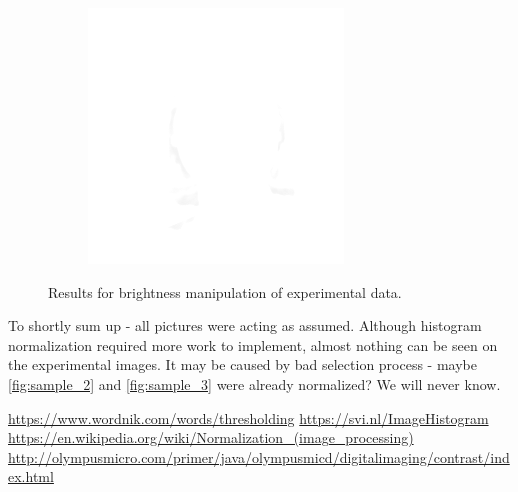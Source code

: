 \documentclass{article}
\begin{document}
\begin{figure}[h]
\begin{subfigure}{.3\textwidth}
    \caption{}
      \label{fig:brigth_low_4}
\end{subfigure}
\begin{subfigure}{.3\textwidth}
  \centering
  \includegraphics[width=0.97\linewidth]{_Figures/sample_4_brigthness_high.png}
    \caption{}
        \label{fig:brigth_high_4}
\end{subfigure}


\caption{Results for brightness manipulation of experimental data. }
\label{fig:brigthness_results}
\end{figure}

To shortly sum up - all pictures were acting as assumed. Although histogram normalization required more work to implement, almost nothing can be seen on the experimental images. It may be caused by bad selection process - maybe \ref{fig:sample_2} and \ref{fig:sample_3} were already normalized? We will never know.
\newpage

\begin{thebibliography}{1}
	 \url{https://www.wordnik.com/words/thresholding}
	 \url{https://svi.nl/ImageHistogram}
	 \url{https://en.wikipedia.org/wiki/Normalization_(image_processing)}
	 \url{http://olympusmicro.com/primer/java/olympusmicd/digitalimaging/contrast/index.html}
\end{thebibliography}

\end{document}
